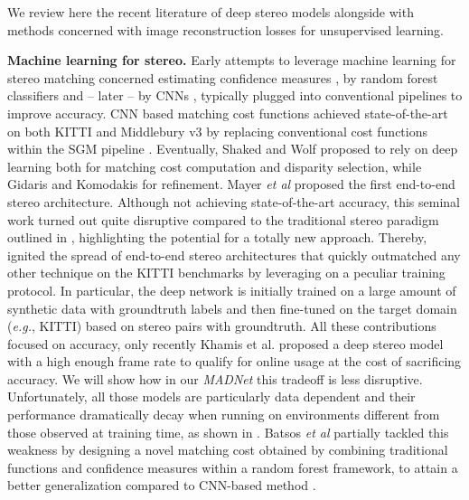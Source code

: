 \documentclass[10pt,twocolumn,letterpaper]{article}
\def\eg{\emph{e.g.}}
\def\etal{\emph{et al}}
\def\netname{\emph{MADNet}}
\def\kitti{KITTI}
\begin{document}
We review here the recent literature of deep stereo models alongside with methods concerned with image reconstruction losses for unsupervised learning.

\textbf{Machine learning for stereo.} Early attempts to leverage machine learning for stereo matching concerned estimating confidence measures \cite{Poggi_2017_ICCV}, by random forest classifiers \cite{Hausler_2013_CVPR,Spyropoulos_2014_CVPR,Park_2015_CVPR,Poggi_2016_3DV} and -- later -- by CNNs \cite{Poggi_2016_BMVC,Seki_2016_BMVC,TOSI_2018_ECCV}, typically plugged into conventional pipelines to improve accuracy. 
CNN based matching cost functions \cite{zbontar2016stereo,Chen_2015_ICCV,luo2016efficient} achieved state-of-the-art on both KITTI and Middlebury v3 by replacing conventional cost functions \cite{SCHARSTEIN_COST} within the SGM pipeline  \cite{hirschmuller2005accurate}. Eventually, Shaked and Wolf \cite{Shaked_2017_CVPR} proposed to rely on deep learning both for matching cost computation and disparity selection, while Gidaris and Komodakis \cite{Gidaris_2017_CVPR} for refinement.
Mayer \etal{} \cite{mayer2016large} proposed the first end-to-end stereo architecture. Although not achieving state-of-the-art accuracy, this seminal work turned out quite disruptive compared to the traditional stereo paradigm outlined in \cite{scharstein2002taxonomy}, highlighting the potential for a totally new approach. Thereby, \cite{mayer2016large} ignited the spread of end-to-end stereo architectures \cite{Kendall_2017_ICCV,Pang_2017_ICCV_Workshops,liang2018learning,chang2018pyramid,jie2018left} that quickly outmatched any other technique on the \kitti{} benchmarks by leveraging on a peculiar training protocol. In particular, the deep network is initially trained on a large amount of synthetic data with groundtruth labels \cite{mayer2016large} and then fine-tuned on the target domain (\eg, \kitti{}) based on stereo pairs with groundtruth. All these contributions focused on accuracy, only recently Khamis et al. \cite{khamis2018stereonet} proposed a deep stereo model with a high enough frame rate to qualify for online usage at the cost of sacrificing accuracy. We will show how in our \netname{} this tradeoff is less disruptive. 
Unfortunately, all those models are particularly data dependent and their performance dramatically decay when running on environments different from those observed at training time, as shown in \cite{Tonioni_2017_ICCV}. Batsos \etal{} \cite{batsos2018cbmv} partially tackled this weakness by designing a novel matching cost obtained by combining traditional functions and confidence measures \cite{Hu_2012_PAMI,Poggi_2017_ICCV} within a random forest framework, to attain a better generalization compared to CNN-based method \cite{zbontar2016stereo}. 
\end{document}
